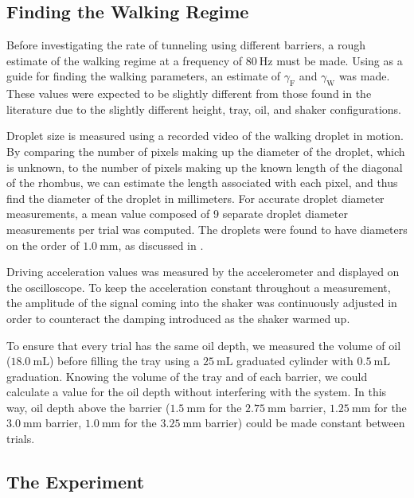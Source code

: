 \subsection{Finding the Walking Regime}

Before investigating the rate of tunneling using different barriers, a rough estimate of the walking regime at a frequency of $80~\mathrm{Hz}$ must be made. Using  as a guide for finding the walking parameters, an estimate of $\gamma_\mathrm{F}$ and $\gamma_\mathrm{W}$ was made. These values were expected to be slightly different from those found in the literature due to the slightly different height, tray, oil, and shaker configurations.

Droplet size is measured using a recorded video of the walking droplet in motion. By comparing the number of pixels making up the diameter of the droplet, which is unknown, to the number of pixels making up the known length of the diagonal of the rhombus, we can estimate the length associated with each pixel, and thus find the diameter of the droplet in millimeters. For accurate droplet diameter measurements, a mean value composed of 9 separate  droplet diameter measurements per trial was computed. The droplets were found to have diameters on the order of $1.0~\mathrm{mm}$, as discussed in . 

Driving acceleration values was measured by the accelerometer and displayed on the oscilloscope. To keep the acceleration constant throughout a measurement, the amplitude of the signal coming into the shaker was continuously adjusted in order to counteract the damping introduced as the shaker warmed up.

To ensure that every trial has the same oil depth, we measured the volume of oil ($18.0~\mathrm{mL}$) before filling the tray using a $25~\mathrm{mL}$ graduated cylinder with $0.5~\mathrm{mL}$ graduation. Knowing the volume of the tray and of each barrier, we could calculate a value for the oil depth without interfering with the system. In this way, oil depth above the barrier ($1.5~\mathrm{mm}$ for the $2.75~\mathrm{mm}$ barrier, $1.25~\mathrm{mm}$ for the $3.0~\mathrm{mm}$ barrier, $1.0~\mathrm{mm}$ for the $3.25~\mathrm{mm}$ barrier) could be made constant between trials. 

\subsection{The Experiment}

